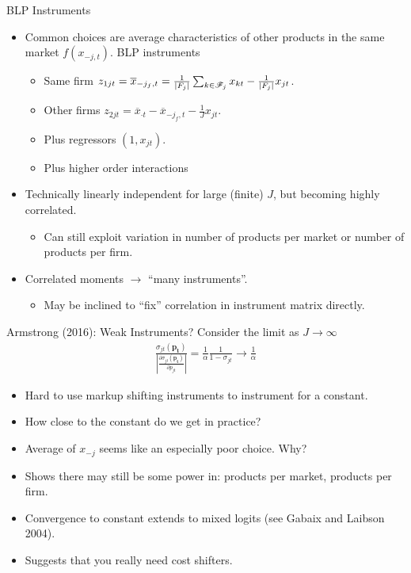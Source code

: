 \documentclass[aspectratio=169,10pt]{beamer}
\begin{document}
\begin{frame}{BLP Instruments}
\begin{itemize}
\item Common choices are average characteristics of other products in the same market $f(x_{-j,t})$. \alert{BLP instruments}
\begin{itemize}
\item Same firm $z_{1jt} = \overline{x}_{-j_f,t} = \frac{1}{\left\vert{F_j}\right\vert}  \sum_{k \in \mathscr{F}_j} x_{kt} - \frac{1}{\left\vert{F_j}\right\vert} x_{jt}$.
\item Other firms $z_{2jt}=\overline{x}_{\cdot t} - \overline{x}_{-j_f,t} - \frac{1}{J} x_{jt}$.
\item Plus regressors $(1, x_{jt})$.
\item Plus higher order interactions 
\end{itemize}
\item Technically linearly independent for large (finite) $J$, but becoming highly correlated.
\begin{itemize}
\item Can still exploit variation in number of products per market or number of products per firm.
\end{itemize}
\item Correlated moments $\rightarrow$ ``many instruments''.
\begin{itemize}
\item May be inclined to ``fix'' correlation in instrument matrix directly.
\end{itemize}
\end{itemize}
\end{frame}


\begin{frame}{Armstrong (2016): Weak Instruments?}
Consider the limit as $J \rightarrow \infty$
\begin{eqnarray*}
\frac{\sigma_{jt}(\symbf{p_t})}{\left|\frac{\partial \sigma_{jt}(\symbf{p_t})}{\partial p_{jt}}\right|} = \frac{1}{\alpha} \frac{1}{1-\sigma_{jt}} \rightarrow \frac{1}{\alpha}
\end{eqnarray*}
\begin{itemize}
\item Hard to use markup shifting instruments to instrument for a constant.
\item How close to the constant do we get in practice?
\item Average of $x_{-j}$ seems like an especially poor choice. Why?
\item Shows there may still be some power in: products per market, products per firm.
\item Convergence to constant extends to mixed logits (see Gabaix and Laibson 2004).
\item Suggests that you really need cost shifters.
\end{itemize}
\end{frame}
\end{document}
